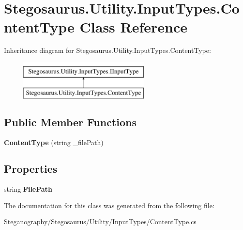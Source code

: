 \hypertarget{class_stegosaurus_1_1_utility_1_1_input_types_1_1_content_type}{}\section{Stegosaurus.\+Utility.\+Input\+Types.\+Content\+Type Class Reference}
\label{class_stegosaurus_1_1_utility_1_1_input_types_1_1_content_type}
Inheritance diagram for Stegosaurus.\+Utility.\+Input\+Types.\+Content\+Type\+:\begin{figure}[H]
\begin{center}
\leavevmode
\includegraphics[height=2.000000cm]{class_stegosaurus_1_1_utility_1_1_input_types_1_1_content_type}
\end{center}
\end{figure}
\subsection*{Public Member Functions}
\begin{DoxyCompactItemize}
\item 
{\bfseries Content\+Type} (string \+\_\+file\+Path)\hypertarget{class_stegosaurus_1_1_utility_1_1_input_types_1_1_content_type_a4619d41d921c650970f52651fae597be}{}\label{class_stegosaurus_1_1_utility_1_1_input_types_1_1_content_type_a4619d41d921c650970f52651fae597be}

\end{DoxyCompactItemize}
\subsection*{Properties}
\begin{DoxyCompactItemize}
\item 
string {\bfseries File\+Path}\hypertarget{class_stegosaurus_1_1_utility_1_1_input_types_1_1_content_type_a1dd896bd9805259e1294da3110b3f0a3}{}\label{class_stegosaurus_1_1_utility_1_1_input_types_1_1_content_type_a1dd896bd9805259e1294da3110b3f0a3}

\end{DoxyCompactItemize}


The documentation for this class was generated from the following file\+:\begin{DoxyCompactItemize}
\item 
Steganography/\+Stegosaurus/\+Utility/\+Input\+Types/Content\+Type.\+cs\end{DoxyCompactItemize}
